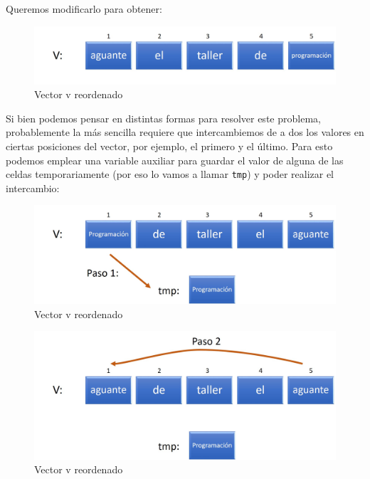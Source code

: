 \documentclass[
]{book}
\begin{document}
Queremos modificarlo para obtener:

\begin{figure}

{\centering \includegraphics[width=0.8\linewidth]{images/15_invertir1} 

}

\caption{Vector v reordenado}\label{fig:inv2}
\end{figure}

Si bien podemos pensar en distintas formas para resolver este problema, probablemente la más sencilla requiere que intercambiemos de a dos los valores en ciertas posiciones del vector, por ejemplo, el primero y el último. Para esto podemos emplear una variable auxiliar para guardar el valor de alguna de las celdas temporariamente (por eso lo vamos a llamar \texttt{tmp}) y poder realizar el intercambio:

\begin{figure}

{\centering \includegraphics[width=0.8\linewidth]{images/16_invertir} 

}

\caption{Vector v reordenado}\label{fig:inv3}
\end{figure}

\begin{figure}

{\centering \includegraphics[width=0.8\linewidth]{images/17_invertir} 

}

\caption{Vector v reordenado}\label{fig:inv4}
\end{figure}
\end{document}

